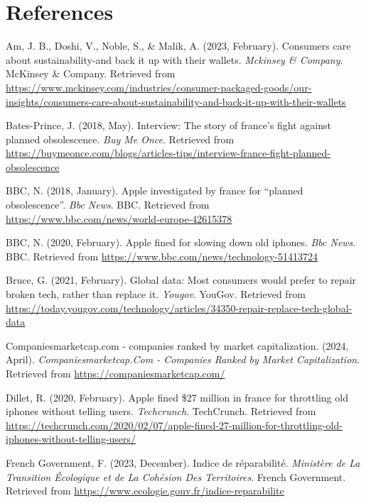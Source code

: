 \documentclass[11pt]{article}
\begin{document}
 \newpage

\section{References}
\label{sec:orgf00369a}
\begin{hangparas}{1.5em}{1}
\hypertarget{citeproc_bib_item_1}{Am, J. B., Doshi, V., Noble, S., \& Malik, A. (2023, February). Consumers care about sustainability-and back it up with their wallets. \textit{Mckinsey \& Company}. McKinsey \& Company. Retrieved from \url{https://www.mckinsey.com/industries/consumer-packaged-goods/our-insights/consumers-care-about-sustainability-and-back-it-up-with-their-wallets}}

\hypertarget{citeproc_bib_item_2}{Bates-Prince, J. (2018, May). Interview: The story of france’s fight against planned obsolescence. \textit{Buy Me Once}. Retrieved from \url{https://buymeonce.com/blogs/articles-tips/interview-france-fight-planned-obsolescence}}

\hypertarget{citeproc_bib_item_3}{BBC, N. (2018, January). Apple investigated by france for “planned obsolescence”. \textit{Bbc News}. BBC. Retrieved from \url{https://www.bbc.com/news/world-europe-42615378}}

\hypertarget{citeproc_bib_item_4}{BBC, N. (2020, February). Apple fined for slowing down old iphones. \textit{Bbc News}. BBC. Retrieved from \url{https://www.bbc.com/news/technology-51413724}}

\hypertarget{citeproc_bib_item_5}{Bruce, G. (2021, February). Global data: Most consumers would prefer to repair broken tech, rather than replace it. \textit{Yougov}. YouGov. Retrieved from \url{https://today.yougov.com/technology/articles/34350-repair-replace-tech-global-data}}

\hypertarget{citeproc_bib_item_6}{Companiesmarketcap.com - companies ranked by market capitalization. (2024, April). \textit{Companiesmarketcap.Com - Companies Ranked by Market Capitalization}. Retrieved from \url{https://companiesmarketcap.com/}}

\hypertarget{citeproc_bib_item_7}{Dillet, R. (2020, February). Apple fined \$27 million in france for throttling old iphones without telling users. \textit{Techcrunch}. TechCrunch. Retrieved from \url{https://techcrunch.com/2020/02/07/apple-fined-27-million-for-throttling-old-iphones-without-telling-users/}}

\hypertarget{citeproc_bib_item_8}{French Government, F. (2023, December). Indice de réparabilité. \textit{Ministère de La Transition Écologique et de La Cohésion Des Territoires}. French Government. Retrieved from \url{https://www.ecologie.gouv.fr/indice-reparabilite}}


\end{hangparas}
\end{document}
